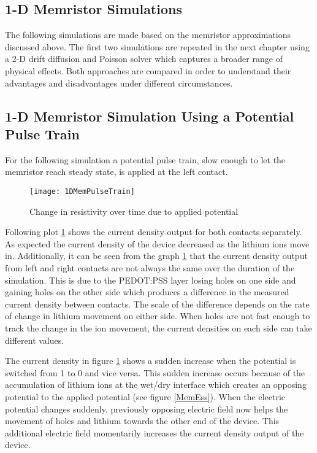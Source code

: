 \begin{doublespace}
\clearpage
\section{1-D Memristor Simulations}

The following simulations are made based on the memristor approximations discussed above. The first two simulations are repeated in the next chapter using a 2-D drift diffusion and Poisson solver which captures a broader range of physical effects. Both approaches are compared in order to understand their advantages and disadvantages under different circumstances.

\subsection{1-D Memristor Simulation Using a Potential Pulse Train}
  
For the following simulation a potential pulse train, slow enough to let the memristor reach steady state, is applied at the left contact.
\begin{figure}[!htp]
\centering
\texttt{[image: 1DMemPulseTrain]}
\caption{Change in resistivity over time due to applied potential} 
\label{MemResTrain}
\end{figure}
 Following plot \ref{MemResTrain} shows the current density output for both contacts separately. As expected the current density of the device decreased as the lithium ions move in. Additionally, it can be seen from the graph \ref{MemResTrain} that the current density output from left and right contacts are not always the same over the duration of the simulation. This is due to the PEDOT:PSS layer losing holes on one side and gaining holes on the other side which produces a difference in the measured current density between contacts. The scale of the difference depends on the rate of change in lithium movement on either side. When holes are not fast enough to track the change in the ion movement, the current densities on each side can take different values.  

The current density in figure \ref{MemResTrain} shows a sudden increase when the potential is switched from 1 to 0 and vice versa. This sudden increase occurs because of the accumulation of lithium ions at the wet/dry interface which creates an opposing potential to the applied potential (see figure \ref{MemEss}). When the electric potential changes suddenly, previously opposing electric field now helps the movement of holes and lithium towards the other end of the device. This additional electric field momentarily increases the current density output of the device.


\end{doublespace}
